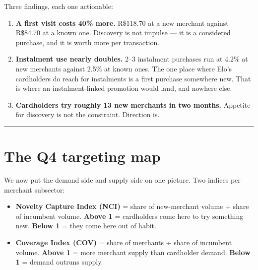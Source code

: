\documentclass[
]{article}
\providecommand{\tightlist}{%
  \setlength{\itemsep}{0pt}\setlength{\parskip}{0pt}}
\begin{document}
Three findings, each one actionable:

\begin{enumerate}
\def\labelenumi{\arabic{enumi}.}
\tightlist
\item
  \textbf{A first visit costs 40\% more.} R\$118.70 at a new merchant
  against R\$84.70 at a known one. Discovery is not impulse --- it is a
  considered purchase, and it is worth more per transaction.
\item
  \textbf{Instalment use nearly doubles.} 2--3 instalment purchases run
  at 4.2\% at new merchants against 2.5\% at known ones. The one place
  where Elo's cardholders do reach for instalments is a first purchase
  somewhere new. That is where an instalment-linked promotion would
  land, and nowhere else.
\item
  \textbf{Cardholders try roughly 13 new merchants in two months.}
  Appetite for discovery is not the constraint. Direction is.
\end{enumerate}

\begin{center}\rule{0.5\linewidth}{0.5pt}\end{center}

\section{The Q4 targeting map}\label{the-q4-targeting-map}

We now put the demand side and supply side on one picture. Two indices
per merchant subsector:

\begin{itemize}
\tightlist
\item
  \textbf{Novelty Capture Index (NCI)} = share of new-merchant volume ÷
  share of incumbent volume. \textbf{Above 1} = cardholders come here to
  try something new. \textbf{Below 1} = they come here out of habit.
\item
  \textbf{Coverage Index (COV)} = share of merchants ÷ share of
  incumbent volume. \textbf{Above 1} = more merchant supply than
  cardholder demand. \textbf{Below 1} = demand outruns supply.
\end{itemize}
\end{document}
